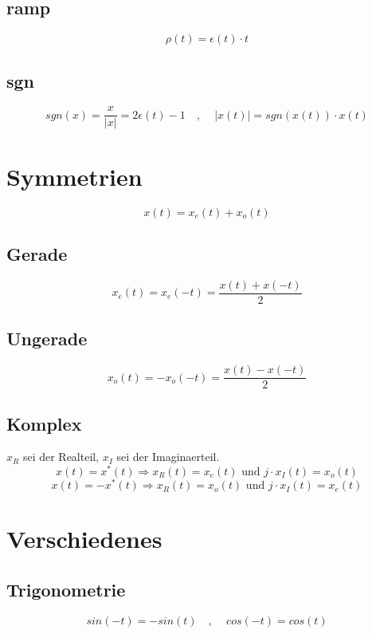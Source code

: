 \documentclass[10pt,a4paper]{article}
\begin{document}
\subsection{ramp}
\[ \rho(t) = \epsilon(t)\cdot t \]

\subsection{sgn}
\[ sgn(x) = \frac{x}{|x|} = 2 \epsilon(t) -1 \,\,\,\,\,\,,\,\,\,\,\,\,\, |x(t)| = sgn(x(t)) \cdot x(t) \]

\section{Symmetrien}
\[x(t) = x_e(t) + x_o(t)\]
\subsection{Gerade}
\[ x_e(t) = x_e(-t) = \frac{x(t)+x(-t)}{2}
\]
\subsection{Ungerade}
\[ x_o(t) = -x_o(-t) = \frac{x(t)-x(-t)}{2}
\]

\subsection{Komplex}
$x_R$ sei der Realteil, $x_I$ sei der Imaginaerteil.
\[x(t) = x^*(t) \Rightarrow x_R(t) = x_e(t) \mbox{ und } j\cdot x_I(t) = x_o(t)\]
\[x(t) = -x^*(t) \Rightarrow x_R(t) = x_o(t) \mbox{ und } j\cdot x_I(t) = x_e(t)\]

\section{Verschiedenes}
\subsection{Trigonometrie}
\[sin(-t) = -sin(t) \,\,\,\,\,\,,\,\,\,\,\,\,\, cos(-t) = cos(t)\]
\end{document}
